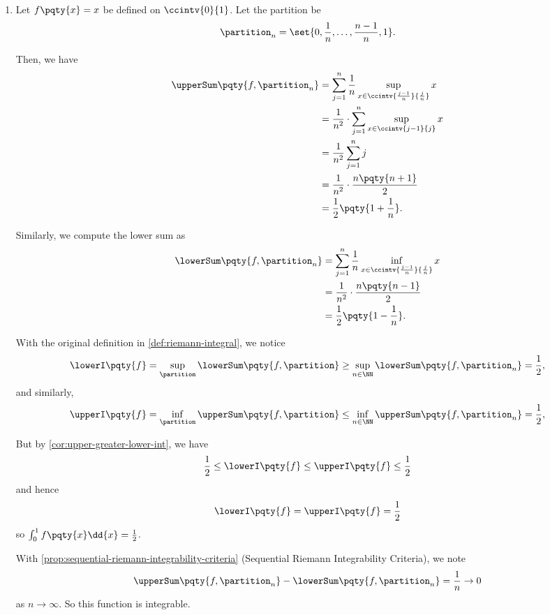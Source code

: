\begin{examples}
    \label{ex:integral-fn}%
    \begin{enumerate}
        \item Let \(f\pqty{x} = x\) be defined on \(\ccintv{0}{1}\). Let the partition be
        \[
            \partition_n = \set{0, \frac{1}{n}, \ldots, \frac{n - 1}{n}, 1}.
        \]

        Then, we have
        \begin{align*}
            \upperSum\pqty{f, \partition_n} &= \sum_{j = 1}^{n} \frac{1}{n} \sup_{x \in \ccintv{\frac{j - 1}{n}}{\frac{j}{n}}} x \\
            &= \frac{1}{n^2} \cdot \sum_{j = 1}^{n} \sup_{x \in \ccintv{j - 1}{j}} x \\
            &= \frac{1}{n^2} \sum_{j = 1}^{n} j \\
            &= \frac{1}{n^2} \cdot \frac{n \pqty{n + 1}}{2} \\
            &= \frac{1}{2} \pqty{1 + \frac{1}{n}}.
        \end{align*}

        Similarly, we compute the lower sum as
        \begin{align*}
            \lowerSum\pqty{f, \partition_n} &= \sum_{j = 1}^{n} \frac{1}{n}\inf_{x \in \ccintv{\frac{j - 1}{n}}{\frac{j}{n}}} x \\
            &= \frac{1}{n^2} \cdot \frac{n \pqty{n - 1}}{2} \\
            &= \frac{1}{2} \pqty{1 - \frac{1}{n}}.
        \end{align*}

        With the original definition in \autoref{def:riemann-integral}, we notice
        \[
            \lowerI\pqty{f} = \sup_{\partition} \lowerSum\pqty{f, \partition} \geq \sup_{n \in \NN} \lowerSum\pqty{f, \partition_n} = \frac{1}{2},
        \]
        and similarly,
        \[
            \upperI\pqty{f} = \inf_{\partition} \upperSum\pqty{f, \partition} \leq \inf_{n \in \NN} \upperSum\pqty{f, \partition_n} = \frac{1}{2},
        \]

        But by \autoref{cor:upper-greater-lower-int}, we have
        \[
            \frac{1}{2} \leq \lowerI\pqty{f} \leq \upperI\pqty{f} \leq \frac{1}{2}
        \]
        and hence
        \[
            \lowerI\pqty{f} = \upperI\pqty{f} = \frac{1}{2}
        \]
        so \(\int_{0}^{1} f\pqty{x} \dd{x} = \frac{1}{2}\).

        With \autoref{prop:sequential-riemann-integrability-criteria} (Sequential Riemann Integrability Criteria), we note
        \[
            \upperSum\pqty{f, \partition_{n}} - \lowerSum\pqty{f, \partition_{n}} = \frac{1}{n} \to 0
        \]
        as \(n \to \infty\). So this function is integrable.


\end{enumerate}
\end{examples}
